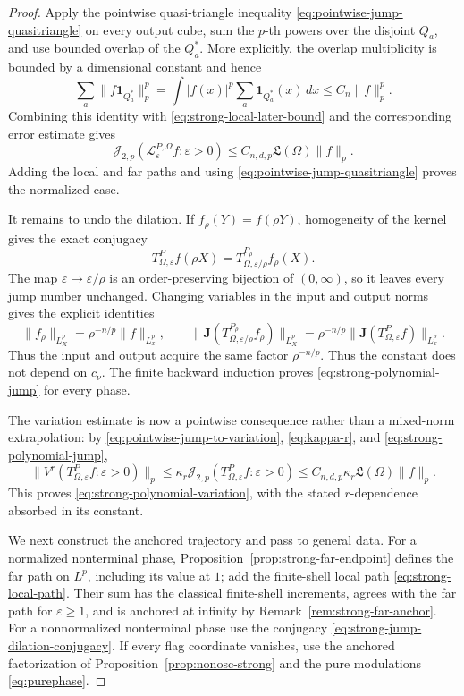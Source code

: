 \documentclass[11pt]{article}
\numberwithin{equation}{section}
\theoremstyle{remark}
\theoremstyle{definition}
\newcommand{\cL}{\mathcal L}
\newcommand{\norm}[1]{\lVert #1\rVert}
\newcommand{\Jop}[1]{\mathcal J_{2,#1}}
\begin{document}
\begin{proof}
Apply the pointwise quasi-triangle inequality
\eqref{eq:pointwise-jump-quasitriangle} on every output cube, sum the
\(p\)-th powers over the disjoint \(Q_a\), and use bounded overlap of the
\(Q_a^*\).  More explicitly, the overlap multiplicity is bounded by a
dimensional constant and hence
\[
 \sum_a\norm{f\mathbf1_{Q_a^*}}_p^p
 =\int |f(x)|^p\sum_a\mathbf1_{Q_a^*}(x)\,dx
 \le C_n\norm f_p^p.
\]
Combining this identity with \eqref{eq:strong-local-later-bound} and the
corresponding error estimate gives
\begin{equation}\label{eq:strong-local-globalized}
 \Jop{p}(\cL^{P,\Omega}_\varepsilon f:\varepsilon>0)
 \leq C_{n,d,p}\mathfrak L(\Omega)\norm f_p.
\end{equation}
Adding the local and far paths and using
\eqref{eq:pointwise-jump-quasitriangle} proves the normalized case.

It remains to undo the dilation.  If \(f_\rho(Y)=f(\rho Y)\), homogeneity
of the kernel gives the exact conjugacy
\begin{equation}\label{eq:strong-jump-dilation-conjugacy}
 T^P_{\Omega,\varepsilon}f(\rho X)
 =T^{P_\rho}_{\Omega,\varepsilon/\rho}f_\rho(X).
\end{equation}
The map $\varepsilon\mapsto\varepsilon/\rho$ is an order-preserving
bijection of $(0,\infty)$, so it leaves every jump number unchanged.
Changing variables in the input and output norms gives the explicit
identities
\[
 \norm{f_\rho}_{L_X^p}=\rho^{-n/p}\norm f_{L_x^p},
 \qquad
 \norm{\mathbf J(T^{P_\rho}_{\Omega,\varepsilon/\rho}f_\rho)}
       _{L_X^p}
 =\rho^{-n/p}
  \norm{\mathbf J(T^P_{\Omega,\varepsilon}f)}_{L_x^p}.
\]
Thus the input and output acquire the same factor $\rho^{-n/p}$.
Thus the constant does not depend on \(c_\nu\).  The finite backward
induction proves \eqref{eq:strong-polynomial-jump} for every phase.

The variation estimate is now a pointwise consequence rather than a
mixed-norm extrapolation: by \eqref{eq:pointwise-jump-to-variation},
\eqref{eq:kappa-r}, and \eqref{eq:strong-polynomial-jump},
\[
 \norm{V^r(T^P_{\Omega,\varepsilon}f:\varepsilon>0)}_p
 \le \kappa_r\Jop{p}(T^P_{\Omega,\varepsilon}f:\varepsilon>0)
 \le C_{n,d,p}\kappa_r\mathfrak L(\Omega)\norm f_p.
\]
This proves \eqref{eq:strong-polynomial-variation}, with the stated
$r$-dependence absorbed in its constant.

We next construct the anchored trajectory and pass to general data.  For a
normalized nonterminal phase,
Proposition~\ref{prop:strong-far-endpoint} defines the far path on $L^p$,
including
its value at $1$; add the finite-shell local path
\eqref{eq:strong-local-path}.  Their sum has the classical finite-shell
increments, agrees with the far path for $\varepsilon\ge1$, and is
anchored at infinity by Remark~\ref{rem:strong-far-anchor}.  For a
nonnormalized nonterminal phase use the conjugacy
\eqref{eq:strong-jump-dilation-conjugacy}.  If every flag coordinate
vanishes, use the anchored factorization of
Proposition~\ref{prop:nonosc-strong} and the pure modulations
\eqref{eq:purephase}.


\end{proof}
\end{document}
